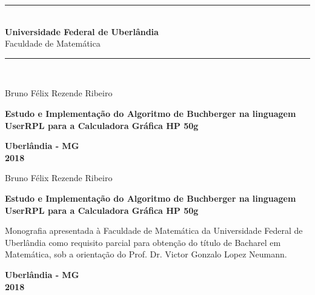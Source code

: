 \documentclass[12pt,a4paper]{report}
\newcommand{\MyLine}{\hfill\noindent\rule[0.5ex]{\linewidth}{0.5pt}\\}
\numberwithin{theorem}{chapter}
\newcommand{\WorkTitle}{Estudo e Implementação do Algoritmo de
  Buchberger na linguagem UserRPL para a Calculadora Gráfica HP 50g}
\newcommand{\WorkDescription}{Monografia apresentada à Faculdade de
  Matemática da Universidade Federal de Uberlândia como requisito
  parcial para obtenção do título de Bacharel em Matemática, sob a
  orientação do Prof. Dr. Victor Gonzalo Lopez Neumann.}
\newcommand{\WorkAuthor}{Bruno Félix Rezende Ribeiro}
\newcommand{\WorkLocal}{Uberlândia - MG} \newcommand{\WorkYear}{2018}
\begin{document}
\begin{center}
  \MyLine
  {\LARGE\textbf{Universidade Federal de Uberlândia}}\\
  {\Large Faculdade de Matemática}
  \MyLine
\end{center}

\vspace{1cm}

\begin{center}
  {\LARGE\WorkAuthor}
\end{center}

\vspace{\fill}

\begin{center}
  {\LARGE\textbf{\WorkTitle}}
\end{center}

\vspace{\fill}

\begin{center}
  \textbf{\WorkLocal}\\
  \textbf{\WorkYear}
\end{center}

\thispagestyle{empty}



\newpage

\begin{center}
  {\LARGE\WorkAuthor}
\end{center}

\vspace{\fill}

\begin{center}
  {\LARGE\textbf{\WorkTitle}}
\end{center}

\vspace{1cm}

\begin{adjustwidth}{7cm}{0cm}
  {\large\WorkDescription}
\end{adjustwidth}

\vspace{\fill}

\begin{center}
  \textbf{\WorkLocal}\\
  \textbf{\WorkYear}
\end{center}

\thispagestyle{empty}
\end{document}

